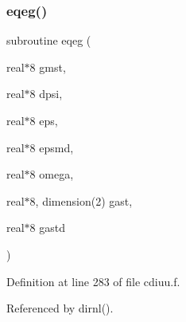 \subsubsection{\texorpdfstring{eqeg()}{eqeg()}}
{\footnotesize\ttfamily subroutine eqeg (\begin{DoxyParamCaption}\item[{real$\ast$8}]{gmst,  }\item[{real$\ast$8}]{dpsi,  }\item[{real$\ast$8}]{eps,  }\item[{real$\ast$8}]{epsmd,  }\item[{real$\ast$8}]{omega,  }\item[{real$\ast$8, dimension(2)}]{gast,  }\item[{real$\ast$8}]{gastd }\end{DoxyParamCaption})}



Definition at line 283 of file cdiuu.\+f.



Referenced by dirnl().

